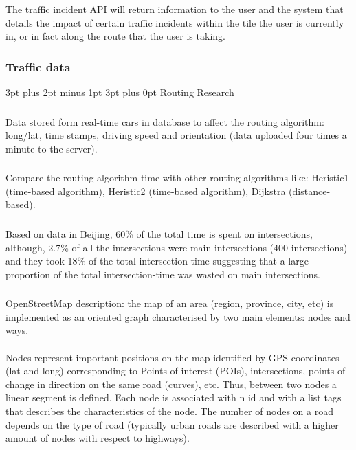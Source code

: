 \documentclass[12pt,a4paper]{article}
\makeatletter
\renewcommand\subsection{\@startsection {subsection}{1}{2mm} %
                               {3pt plus 2pt minus 1pt} %
                               {3pt plus 0pt} %
                               {\normalfont\bfseries}}
\makeatother
\begin{document}
The traffic incident API will return information to the user and the system that details the impact of certain traffic incidents within the tile the user is currently in, or in fact along the route that the user is taking. 

\subsubsection{Traffic data}

\subsection{Routing Research}

\subsubsection{}
Data stored form real-time cars in database to affect the routing algorithm: long/lat, time stamps, driving speed and orientation (data uploaded four times a minute to the server). \cite{Zheng2018}

\subsubsection{}
Compare the routing algorithm time with other routing algorithms like: Heristic1 (time-based algorithm), Heristic2 (time-based algorithm), Dijkstra (distance-based). \cite{Zheng2018}

\subsubsection{}
Based on data in Beijing, 60\% of the total time is spent on intersections, although, 2.7\% of all the intersections were main intersections (400 intersections) and they took 18\% of the total intersection-time suggesting that a large proportion of the total intersection-time was wasted on main intersections. \cite{Liu}

\subsubsection{}
OpenStreetMap description: the map of an area (region, province, city, etc) is implemented as an oriented graph characterised by two main elements: nodes and ways.
\paragraph{}
Nodes represent important positions on the map identified by GPS coordinates (lat and long) corresponding to Points of interest (POIs), intersections, points of change in direction on the same road (curves), etc. Thus, between two nodes a linear segment is defined. Each node is associated with n id and with a list tags that describes the characteristics of the node. The number of nodes on a road depends on the type of road (typically urban roads are described with a higher amount of nodes with respect to highways).
\end{document}
